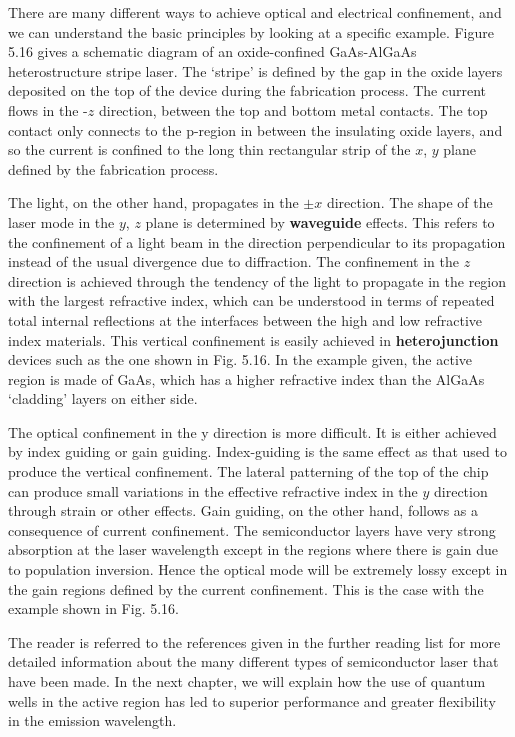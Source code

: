 \documentclass[12pt]{book}
\begin{document}
{There are many different ways to achieve optical and electrical confinement, and we can understand the basic principles by looking at a specific example. Figure 5.16 gives a schematic diagram of an oxide-confined GaAs-AlGaAs heterostructure stripe laser. The `stripe' is defined by the gap in the oxide layers deposited on the top of the device during the fabrication process. The current flows in the -$z$ direction, between the top and bottom metal contacts. The top contact only connects to the p-region in between the insulating oxide layers, and so the current is confined to the long thin rectangular strip of the $x$, $y$ plane defined by the fabrication process.

The light, on the other hand, propagates in the $\pm x$ direction. The shape of the laser mode in the $y$, $z$ plane is determined by \textbf{waveguide} effects. This refers to the confinement of a light beam in the direction perpendicular to its propagation instead of the usual divergence due to diffraction. The confinement in the $z$ direction is achieved through the tendency of the light to propagate in the region with the largest refractive index, which can be understood in terms of repeated total internal reflections at the interfaces between the high and low refractive index materials. This vertical confinement is easily achieved in \textbf{heterojunction} devices such as the one shown in Fig. 5.16. In the example given, the active region is made of GaAs, which has a higher refractive index than the AlGaAs `cladding' layers on either side.

The optical confinement in the y direction is more difficult. It is either achieved by index guiding or gain guiding. Index-guiding is the same effect as that used to produce the vertical confinement. The lateral patterning of the top of the chip can produce small variations in the effective refractive index in the $y$ direction through strain or other effects. Gain guiding, on the other hand, follows as a consequence of current confinement. The semiconductor layers have very strong absorption at the laser wavelength except in the regions where there is gain due to population inversion. Hence the optical mode will be extremely lossy except in the gain regions defined by the current confinement. This is the case with the example shown in Fig. 5.16.

The reader is referred to the references given in the further reading list for more detailed information about the many different types of semiconductor laser that have been made. In the next chapter, we will explain how the use of quantum wells in the active region has led to superior performance and greater flexibility in the emission wavelength.

}
\end{document}
